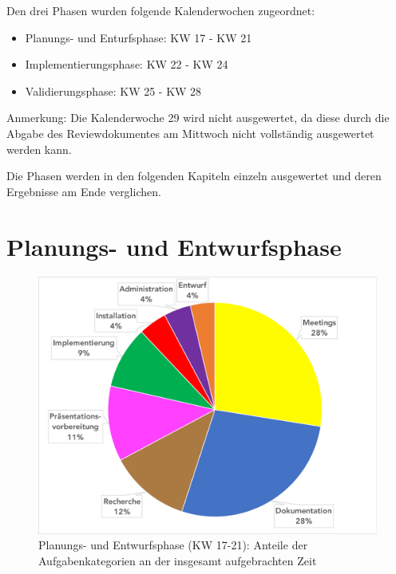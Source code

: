 \documentclass[../review_3.tex]{subfiles}
\begin{document}
Den drei Phasen wurden folgende Kalenderwochen zugeordnet:
\begin{itemize}
    \item Planungs- und Enturfsphase: KW 17 - KW 21
    \item Implementierungsphase: KW 22 - KW 24
    \item Validierungsphase: KW 25 - KW 28
\end{itemize}
Anmerkung: Die Kalenderwoche 29 wird nicht ausgewertet, da diese durch die Abgabe des Reviewdokumentes am Mittwoch nicht vollständig ausgewertet werden kann.

Die Phasen werden in den folgenden Kapiteln einzeln ausgewertet und deren Ergebnisse am Ende verglichen.
\section{Planungs- und Entwurfsphase}

\begin{figure} [h]
    \centering
    \includegraphics[width = 0.9 \linewidth]{img/Kimai1.pdf}
    \caption{Planungs- und Entwurfsphase (KW 17-21): Anteile der Aufgabenkategorien an der insgesamt aufgebrachten Zeit}
    \label{kategorien}
\end{figure}
\end{document}
